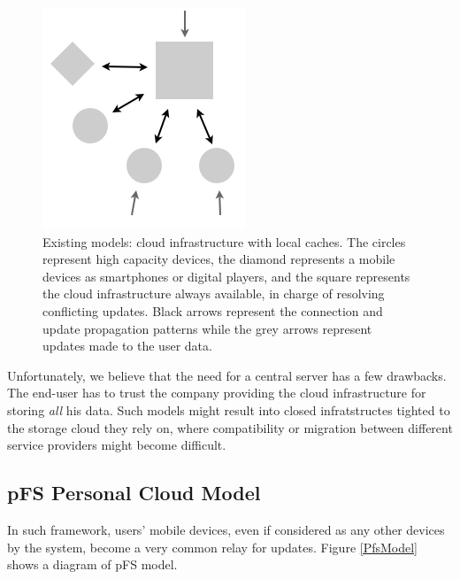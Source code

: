 \begin{figure}[ht]
\begin{center}
  \includegraphics [scale=0.4] {img/other_model}
  \caption{\label{OthModel}
    {\small Existing models: cloud infrastructure with local
      caches. The circles represent high capacity devices, the diamond
      represents a mobile devices as smartphones or digital players,
      and the square represents the cloud infrastructure always
      available, in charge of resolving conflicting updates. Black
      arrows represent the connection and update propagation patterns
      while the grey arrows represent updates made to the user data.}}
\end{center}
\end{figure}

Unfortunately, we believe that the need for a central server has a few
drawbacks. The end-user has to trust the company providing the cloud
infrastructure for storing \emph{all} his data. Such models might
result into closed infratstructes tighted to the storage cloud
they rely on, where compatibility or migration between different
service providers might become difficult.

\subsection {pFS Personal Cloud Model}

In such
framework, users' mobile devices, even if considered as any other
devices by the system, become a very common relay for updates. Figure
\ref{PfsModel} shows a diagram of pFS model.

